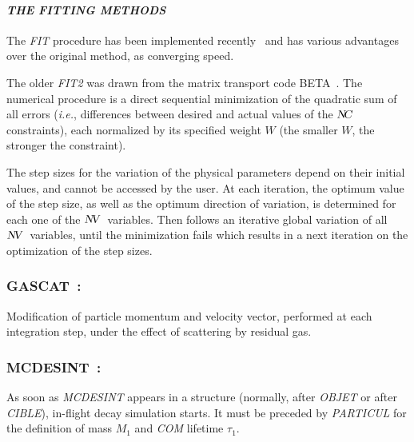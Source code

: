 \smallskip

\paragraph{\textit{THE FITTING METHODS \protect\cite{NedlerMead,Biblio10}}}    %


\noindent The \textsl{FIT} procedure has been implemented  recently~\cite{NedlerMead} and 
has various advantages over the original method, as converging speed. 

\noindent The  older \textsl{FIT2} was drawn from  the matrix transport code BETA~\cite{Biblio10}. 
 The numerical procedure is a direct sequential minimization of the quadratic
sum of all errors (\emph{i.e.}, differences between desired and actual values of the $\textsl{N\!C }$ 
constraints), each normalized by its specified weight $ W $ (the smaller $ W$,
the stronger the constraint). 

\noindent The step sizes for the variation of the physical parameters depend
on their initial  values, and cannot be accessed by the user. At each iteration, the 
optimum value of the step size, as well as the optimum direction of variation,
is determined for each one of the $\textsl{N\!V }$ variables. Then follows an iterative
global variation of all $\textsl{N\!V }$ variables, until the minimization fails which results in a
next iteration on the optimization of the step sizes. 

\newpage

\subsubsection*{GASCAT~: \GASCATTitl} \label{GASCAT}
\medskip

Modification of particle momentum and velocity vector, performed at each integration step, 
under the effect of scattering by residual gas.

\bigskip





\newpage

\subsubsection*{MCDESINT~: \MCDESINTTitl \protect\cite{Biblio11}}
\label{MCDESINT}

 As soon as \textsl{MCDESINT}  appears in a structure
(normally, after \textsl{OBJET} or after \textsl{CIBLE}),
 in-flight decay simulation starts. 
It must be preceded by \textsl{PARTICUL} for the definition of mass $ M_1 $ 
and \textsl{COM} 
lifetime $\tau_1$. 

